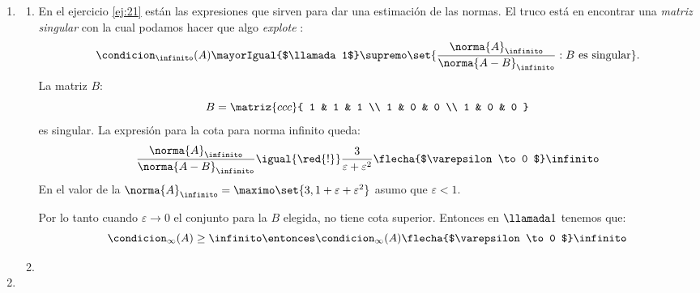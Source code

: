 \begin{enumerate}[label=(\alph*)]
  \item
        \begin{enumerate}[label=(\roman*)]
          \item En el ejercicio \ref{ej:21} están las expresiones que sirven para dar una estimación de las normas. El truco
                está en encontrar una \textit{matriz singular} con la cual podamos hacer que algo \textit{explote} :
                $$
                  \condicion_\infinito(A)
                  \mayorIgual{$\llamada1$}
                  \supremo \set{\frac{\norma{A}_\infinito}{\norma{A - B}_\infinito} : B \text{ es singular}}.
                $$
                La matriz $B$:
                $$
                  B =
                  \matriz{ccc}{
                    1 & 1 & 1 \\
                    1 & 0 & 0 \\
                    1 & 0 & 0
                  }
                $$
                es singular. La expresión para la cota para norma infinito queda:
                $$
                  \frac{\norma{A}_\infinito}{\norma{A - B}_\infinito}
                  \igual{\red{!}}
                  \frac{3}{\varepsilon + \varepsilon^2}
                  \flecha{$\varepsilon \to 0 $} \infinito
                $$
                En \red{!} el valor de la $\norma{A}_\infinito = \maximo\set{3,1+ \varepsilon + \varepsilon^2}$ asumo que $\varepsilon < 1$.

                Por lo tanto cuando $\varepsilon \to 0$ el conjunto para la $B$ elegida, no tiene cota superior. Entonces
                en $\llamada1$ tenemos que:
                $$
                  \condicion_\infty(A)
                  \geq
                  \infinito
                  \entonces
                  \condicion_\infty(A)
                  \flecha{$\varepsilon \to 0 $} \infinito
                $$

          \item \hacer
        \end{enumerate}

  \item \hacer
\end{enumerate}

\begin{aportes}
  \item {}
\end{aportes}

